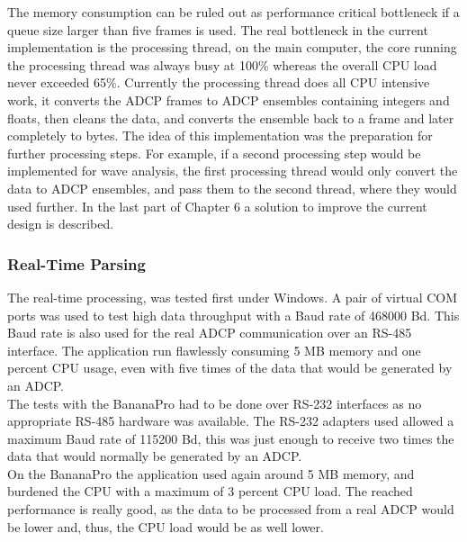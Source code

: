The memory consumption can be ruled out as performance critical bottleneck if a queue size larger than five frames is used. The real bottleneck in the current implementation is the processing thread, on the main computer, the core running the processing thread was always busy at 100\% whereas the overall CPU load never exceeded 65\%. Currently the processing thread does all CPU intensive work, it converts the ADCP frames to ADCP ensembles containing integers and floats, then cleans the data, and converts the ensemble back to a frame and later completely to bytes. The idea of this implementation was the preparation for further processing steps. For example, if a second processing step would be implemented for wave analysis, the first processing thread would only convert the data to ADCP ensembles, and pass them to the second thread, where they would used further. In the last part of Chapter 6 a solution to improve the current design is described.

\subsubsection{Real-Time Parsing} 
The real-time processing, was tested first under Windows. A pair of virtual COM ports was used to test high data throughput with a Baud rate of 468000 Bd. This Baud rate is also used for the real ADCP communication over an RS-485 interface. The application run flawlessly consuming 5 MB memory and one percent CPU usage, even with five times of the data that would be generated by an ADCP.\\
The tests with the BananaPro had to be done over RS-232 interfaces as no appropriate RS-485 hardware was available. The RS-232 adapters used allowed a maximum Baud rate of 115200 Bd, this was just enough to receive two times the data that would normally be generated by an ADCP.\\
On the BananaPro the application used again around 5 MB memory, and burdened the CPU with a maximum of 3 percent CPU load. The reached performance is really good, as the data to be processed from a real ADCP would be lower and, thus, the CPU load would be as well lower.
